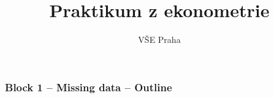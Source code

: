 \documentclass{beamer}
\title[Block 1]{Praktikum z ekonometrie} %
\author{VŠE Praha} %
\institute[4EK417] %
{
\medskip
\textit{Tomáš Formánek} %
}
\date{} %
\begin{document}
\begin{frame}
\titlepage %
\end{frame}

\begin{frame}
\frametitle{Block 1 -- Missing data -- Outline} %
\tableofcontents %
\end{frame}

\end{document}
